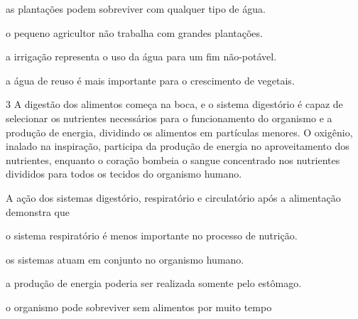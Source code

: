 \begin{escolha}
\item as plantações podem sobreviver com qualquer tipo de água.

\item o pequeno agricultor não trabalha com grandes plantações.

\item a irrigação representa o uso da água para um fim não-potável.

\item a água de reuso é mais importante para o crescimento de vegetais.
\end{escolha}


\num{3} A digestão dos alimentos começa na boca, e o sistema
digestório é capaz de selecionar os nutrientes necessários para o
funcionamento do organismo e a produção de energia, dividindo os
alimentos em partículas menores. O oxigênio, inalado na inspiração,
participa da produção de energia no aproveitamento dos nutrientes,
enquanto o coração bombeia o sangue concentrado nos nutrientes divididos
para todos os tecidos do organismo humano.

A ação dos sistemas digestório, respiratório e circulatório após a
alimentação demonstra que

\begin{escolha}
\item o sistema respiratório é menos importante no processo de nutrição.

\item os sistemas atuam em conjunto no organismo humano.

\item a produção de energia poderia ser realizada somente pelo estômago.

\item o organismo pode sobreviver sem alimentos por muito tempo
\end{escolha}

